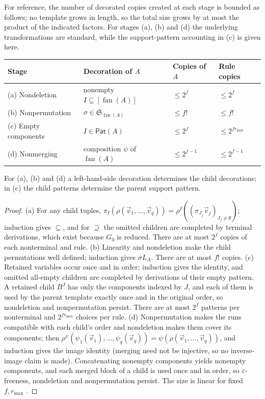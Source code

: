 \documentclass[11pt]{article}
\numberwithin{equation}{section}
\theoremstyle{plain}
\theoremstyle{definition}
\theoremstyle{remark}
\newcommand{\tuple}[1]{\vec{#1}}
\newcommand{\eps}{\varepsilon}
\newcommand{\fan}{\operatorname{fan}}
\theoremstyle{plain}
\begin{document}
For reference, the number of decorated copies created at each
stage is bounded as follows; no template grows in length, so the
total size grows by at most the product of the indicated factors.
For stages (a), (b) and (d) the underlying transformations are
standard, while the support-pattern accounting in (c) is given
here.
\begin{center}
\footnotesize
\setlength{\tabcolsep}{4pt}
\renewcommand{\arraystretch}{1.15}
\begin{tabular}{@{}llll@{}}
\hline
Stage & Decoration of $A$ & Copies of $A$ & Rule copies\\
\hline
(a) Nondeletion & nonempty $I\subseteq[\fan(A)]$ & $\le2^f$ & $\le2^f$\\
(b) Nonpermutation & $\sigma\in\mathfrak S_{\fan(A)}$ & $\le f!$ & $\le f!$\\
(c) Empty components & $I\in\mathsf{Pat}(A)$ & $\le2^f$ & $\le2^{fr_{\max}}$\\
(d) Nonmerging & composition $\psi$ of $\fan(A)$ & $\le2^{f-1}$ & $\le2^{f-1}$\\
\hline
\end{tabular}
\end{center}
For (a), (b) and (d) a left-hand-side decoration determines the
child decorations; in (c) the child patterns determine the
parent support pattern.

\begin{proof}
(a) For any child tuples,
$\pi_I(\rho(\tuple v_1,\ldots,\tuple v_q))=\rho^I((\pi_{J_j}\tuple v_j)_{J_j\ne\emptyset})$;
induction gives $\subseteq$, and for $\supseteq$ the omitted children are completed by
terminal derivations, which exist because $G_0$ is reduced.  There are at most $2^f$
copies of each nonterminal and rule.
(b) Linearity and nondeletion make the child permutations well defined; induction gives
$\sigma L_A$.  There are at most $f!$ copies.
(c) Retained variables occur once and in order; induction gives the identity, and
omitted all-empty children are completed by derivations of their empty pattern.  A
retained child $B^J$ has only the components indexed by $J$, and each of them is used by
the parent template exactly once and in the original order, so nondeletion and
nonpermutation persist.  There
are at most $2^f$ patterns per nonterminal and $2^{fr_{\max}}$ choices per rule.
(d) Nonpermutation makes the runs compatible with each child's order and nondeletion
makes them cover its components; then
$\rho^\psi(\psi_1(\tuple v_1),\ldots,\psi_q(\tuple v_q))=\psi(\rho(\tuple v_1,\ldots,\tuple v_q))$,
and induction gives the image identity (merging need not be injective, so no
inverse-image claim is made).  Concatenating nonempty components yields nonempty
components, and each merged block of a child is used once and in order, so
$\eps$-freeness, nondeletion and nonpermutation persist.  The size is linear for fixed $f,r_{\max}$
\cite{Yoshinaka2011}.
\end{proof}
\end{document}
